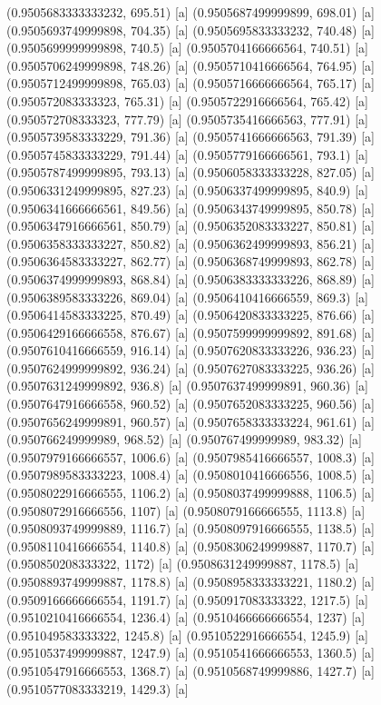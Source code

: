 {{{(0.9505683333333232, 695.51) [a] 
(0.9505687499999899, 698.01) [a] 
(0.9505693749999898, 704.35) [a] 
(0.9505695833333232, 740.48) [a] 
(0.9505699999999898, 740.5) [a] 
(0.9505704166666564, 740.51) [a] 
(0.9505706249999898, 748.26) [a] 
(0.9505710416666564, 764.95) [a] 
(0.9505712499999898, 765.03) [a] 
(0.9505716666666564, 765.17) [a] 
(0.950572083333323, 765.31) [a] 
(0.9505722916666564, 765.42) [a] 
(0.950572708333323, 777.79) [a] 
(0.9505735416666563, 777.91) [a] 
(0.9505739583333229, 791.36) [a] 
(0.9505741666666563, 791.39) [a] 
(0.9505745833333229, 791.44) [a] 
(0.9505779166666561, 793.1) [a] 
(0.9505787499999895, 793.13) [a] 
(0.9506058333333228, 827.05) [a] 
(0.9506331249999895, 827.23) [a] 
(0.9506337499999895, 840.9) [a] 
(0.9506341666666561, 849.56) [a] 
(0.9506343749999895, 850.78) [a] 
(0.9506347916666561, 850.79) [a] 
(0.9506352083333227, 850.81) [a] 
(0.9506358333333227, 850.82) [a] 
(0.9506362499999893, 856.21) [a] 
(0.9506364583333227, 862.77) [a] 
(0.9506368749999893, 862.78) [a] 
(0.9506374999999893, 868.84) [a] 
(0.9506383333333226, 868.89) [a] 
(0.9506389583333226, 869.04) [a] 
(0.9506410416666559, 869.3) [a] 
(0.9506414583333225, 870.49) [a] 
(0.9506420833333225, 876.66) [a] 
(0.9506429166666558, 876.67) [a] 
(0.9507599999999892, 891.68) [a] 
(0.9507610416666559, 916.14) [a] 
(0.9507620833333226, 936.23) [a] 
(0.9507624999999892, 936.24) [a] 
(0.9507627083333225, 936.26) [a] 
(0.9507631249999892, 936.8) [a] 
(0.9507637499999891, 960.36) [a] 
(0.9507647916666558, 960.52) [a] 
(0.9507652083333225, 960.56) [a] 
(0.9507656249999891, 960.57) [a] 
(0.9507658333333224, 961.61) [a] 
(0.950766249999989, 968.52) [a] 
(0.950767499999989, 983.32) [a] 
(0.9507979166666557, 1006.6) [a] 
(0.9507985416666557, 1008.3) [a] 
(0.9507989583333223, 1008.4) [a] 
(0.9508010416666556, 1008.5) [a] 
(0.9508022916666555, 1106.2) [a] 
(0.9508037499999888, 1106.5) [a] 
(0.9508072916666556, 1107) [a] 
(0.9508079166666555, 1113.8) [a] 
(0.9508093749999889, 1116.7) [a] 
(0.9508097916666555, 1138.5) [a] 
(0.9508110416666554, 1140.8) [a] 
(0.9508306249999887, 1170.7) [a] 
(0.950850208333322, 1172) [a] 
(0.9508631249999887, 1178.5) [a] 
(0.9508893749999887, 1178.8) [a] 
(0.9508958333333221, 1180.2) [a] 
(0.9509166666666554, 1191.7) [a] 
(0.950917083333322, 1217.5) [a] 
(0.9510210416666554, 1236.4) [a] 
(0.9510466666666554, 1237) [a] 
(0.951049583333322, 1245.8) [a] 
(0.9510522916666554, 1245.9) [a] 
(0.9510537499999887, 1247.9) [a] 
(0.9510541666666553, 1360.5) [a] 
(0.9510547916666553, 1368.7) [a] 
(0.9510568749999886, 1427.7) [a] 
(0.9510577083333219, 1429.3) [a] 
}}}
